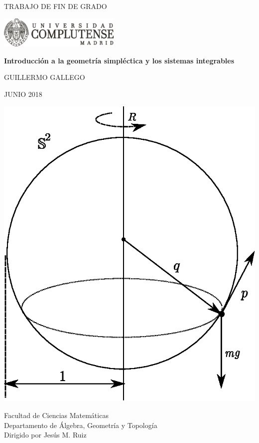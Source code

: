 %
\begin{titlepage}
\begin{minipage}{0.5\textwidth}
  \centering
    \LARGE TRABAJO DE FIN DE GRADO 
  \end{minipage}
\begin{minipage}{0.5\textwidth}
  \centering
\includegraphics[height=1.5cm]{portada/Negro-transparente}
  \end{minipage}

  \vfill

\begin{center}
\rm \Huge\bfseries\sffamily Introducción a la geometría simpléctica y los sistemas integrables

\vspace*{1cm}
\rm \Large
\sc GUILLERMO GALLEGO

\vspace*{.5 cm}
\sc  JUNIO 2018 \\

\vfill

\includegraphics{pics/espendulo.eps}

\vfill

\rm \large
    Facultad de Ciencias Matemáticas \\
    Departamento de Álgebra, Geometría y Topología \\
Dirigido por Jesús M. Ruiz
\end{center}
\end{titlepage}  



